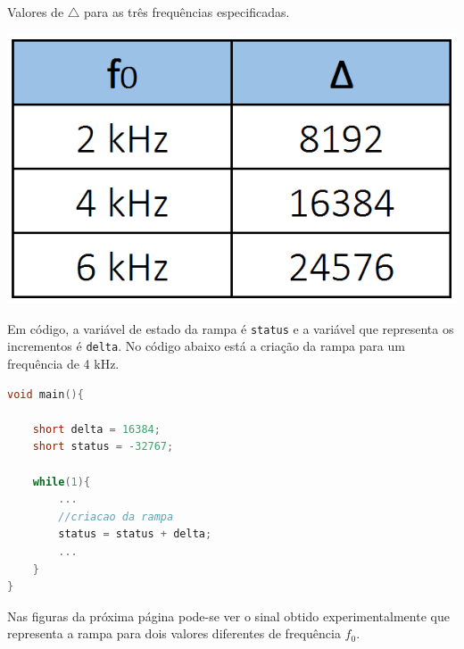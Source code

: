 \documentclass[11pt]{article}
\numberwithin{equation}{section}
\begin{document}
\begin{table}[H]
	\centering
	\caption{Valores de $\bigtriangleup$ para as três frequências especificadas.}
	\vspace{-1.5mm}
	\includegraphics[keepaspectratio=true, scale=0.45]{tabelas/tabela2}
\end{table}

Em código, a variável de estado da rampa é \texttt{status} e a variável que representa os incrementos é \texttt{delta}. No código abaixo está a criação da rampa para um frequência de 4 kHz.

\begin{lstlisting}[language=C]
void main(){

	short delta = 16384;
	short status = -32767;

	while(1){
		...	
		//criacao da rampa	
		status = status + delta;
		...
	}
}
\end{lstlisting}

Nas figuras da próxima página pode-se ver o sinal obtido experimentalmente que representa a rampa para dois valores diferentes de frequência $f_{0}$.
\end{document}
